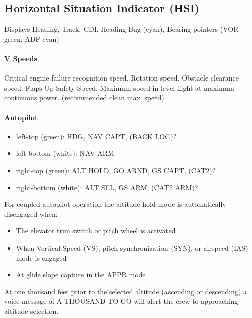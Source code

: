 \subsection{Horizontal Situation Indicator (HSI)}
\label{sec:hsi}

Displays Heading, Track, \gls{CDI}, Heading Bug (cyan), Bearing pointers (VOR green, ADF cyan)

\paragraph*{V Speeds}

\begin{itemize}
   Critical engine failure recognition speed.
   Rotation speed.
   Obstacle clearance speed.
   Flaps Up Safety Speed.
   Maximum speed in level flight at maximum continuous power. (recommended clean max. speed)
\end{itemize}

\paragraph*{Autopilot}

\begin{itemize}
  \item left-top (green): HDG, NAV CAPT, (BACK LOC)?
  \item left-bottom (white): NAV ARM

  \item right-top (green): ALT HOLD, GO ARND, GS CAPT, (CAT2)?
  \item right-bottom (white): ALT SEL, GS ARM, (CAT2 ARM)?
\end{itemize}

For coupled autopilot operation the altitude hold mode is automatically disengaged when:

\begin{itemize}
\item The elevator trim switch or pitch wheel is activated
\item When Vertical Speed (VS), pitch synchronization (SYN), or airspeed (IAS) mode is engaged
\item At glide slope capture in the APPR mode
\end{itemize}

At one thousand feet prior to the selected altitude (ascending or descending) a voice message of A THOUSAND TO GO will alert the crew to approaching altitude selection.

